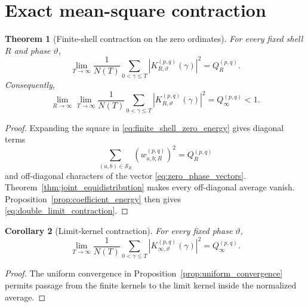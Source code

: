 \documentclass[11pt]{amsart}
\numberwithin{equation}{section}
\theoremstyle{plain}
\newtheorem{theorem}{Theorem}[section]
\newtheorem{corollary}[theorem]{Corollary}
\theoremstyle{definition}
\theoremstyle{remark}
\begin{document}
\section{Exact mean-square contraction}
\label{sec:mean_square_contraction}

\begin{theorem}[Finite-shell contraction on the zero ordinates]
\label{thm:finite_shell_contraction}
For every fixed shell $R$ and phase $\vartheta$,
\begin{equation}
\lim_{T\to\infty}
\frac1{N(T)}
\sum_{0<\gamma\leq T}
\left|K_{R,\vartheta}^{(p,q)}(\gamma)\right|^2
=
Q_R^{(p,q)}.
\label{eq:finite_shell_zero_energy}
\end{equation}
Consequently,
\begin{equation}
\lim_{R\to\infty}\lim_{T\to\infty}
\frac1{N(T)}
\sum_{0<\gamma\leq T}
\left|K_{R,\vartheta}^{(p,q)}(\gamma)\right|^2
=
Q_\infty^{(p,q)}<1.
\label{eq:double_limit_contraction}
\end{equation}
\end{theorem}

\begin{proof}
Expanding the square in \eqref{eq:finite_shell_zero_energy} gives diagonal terms
\begin{equation}
\sum_{(a,b)\in\mathcal S_R}
\left(w_{a,b;R}^{(p,q)}\right)^2
=Q_R^{(p,q)}
\label{eq:diagonal_energy}
\end{equation}
and off-diagonal characters of the vector \eqref{eq:zero_phase_vectors}.  Theorem~\ref{thm:joint_equidistribution} makes every off-diagonal average vanish.  Proposition~\ref{prop:coefficient_energy} then gives \eqref{eq:double_limit_contraction}.
\end{proof}

\begin{corollary}[Limit-kernel contraction]
\label{cor:limit_kernel_contraction}
For every fixed phase $\vartheta$,
\begin{equation}
\lim_{T\to\infty}
\frac1{N(T)}
\sum_{0<\gamma\leq T}
\left|K_{\infty,\vartheta}^{(p,q)}(\gamma)\right|^2
=Q_\infty^{(p,q)}.
\label{eq:limit_kernel_zero_energy}
\end{equation}
\end{corollary}

\begin{proof}
The uniform convergence in Proposition~\ref{prop:uniform_convergence} permits passage from the finite kernels to the limit kernel inside the normalized average.
\end{proof}
\end{document}
